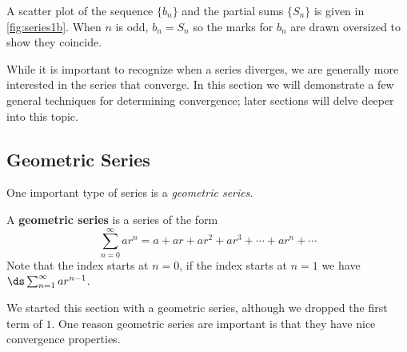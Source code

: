 {\begin{enumerate}

A scatter plot of the sequence $\{b_n\}$ and the partial sums $\{S_n\}$ is given in \autoref{fig:series1b}. When $n$ is odd, $b_n = S_n$ so the marks for $b_n$ are drawn oversized to show they coincide.\eoehere
\end{enumerate}}

While it is important to recognize when a series diverges, we are generally more interested in the series that  converge. In this section we will demonstrate a few general techniques for determining convergence; later sections will delve deeper into this topic.

\subsection{Geometric Series}

One important type of series is a \emph{geometric series}.

{A \textbf{geometric series} is a series of the form 
\[\sum_{n=0}^\infty ar^n = a+ar+ar^2+ar^3+\dotsb+ar^n+\dotsb\]
Note that the index starts at $n=0$, if the index starts at $n=1$ we have $\ds \sum_{n=1}^\infty ar^{n-1}$.%
}

We started this section with a geometric series, although we dropped the first term of $1$. One reason geometric series are important is that they have nice convergence properties.

